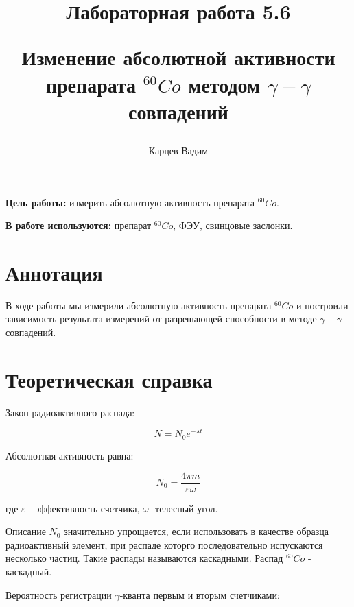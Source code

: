 \documentclass[12pt]{article}
\author{Карцев Вадим}
\title{Лабораторная работа 5.6

Изменение абсолютной активности препарата $^{60}Co$  методом $\gamma - \gamma$
совпадений}
\begin{document}
  \maketitle

  \textbf{Цель работы:} измерить абсолютную активность препарата $^{60}Co$.

  \textbf{В работе используются:} препарат $^{60}Co$, ФЭУ, свинцовые заслонки.

  \section{Аннотация}

    В ходе работы мы измерили абсолютную активность препарата $^{60}Co$ и
    построили зависимость результата измерений от разрешающей способности
    в методе $\gamma - \gamma$ совпадений.


  \newpage
  \section{Теоретическая справка}

    Закон радиоактивного распада:

    $$
      N=N_0e^{-\lambda t}
    $$

    Абсолютная активность равна:

    $$
      N_0=\frac{4\pi m}{\varepsilon \omega}
    $$

    где $\varepsilon$ - эффективность счетчика, $\omega$ -телесный угол.

    Описание $N_0$ значительно упрощается, если использовать в качестве образца
    радиоактивный элемент, при распаде которго последовательно испускаются
    несколько частиц. Такие распады называются каскадными. Распад $^{60}Co$ -
    каскадный.

    \begin{figure}[h!]
      \begin{minipage}[h]{\linewidth}
      \end{minipage}
      \label{pic:cobalt}
    \end{figure}

    Вероятность регистрации $\gamma$-кванта первым и вторым счетчиками:
\end{document}
